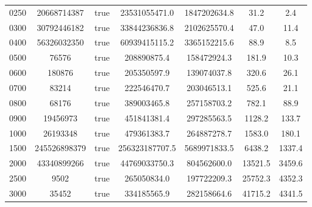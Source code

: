 \begin{center}
\begin{tabular}{|| c | c | c | c | c | c | c ||}
0250 & 20668714387 & true & 23531055471.0 & 1847202634.8 & 31.2 & 2.4 \\
0300 & 30792446182 & true & 33844236836.8 & 2102625570.4 & 47.0 & 11.4 \\
0400 & 56326032350 & true & 60939415115.2 & 3365152215.6 & 88.9 & 8.5 \\
0500 & 76576 & true & 208890875.4 & 158472924.3 & 181.9 & 10.3 \\
0600 & 180876 & true & 205350597.9 & 139074037.8 & 320.6 & 26.1 \\
0700 & 83214 & true & 222546470.7 & 203046513.1 & 525.6 & 21.1 \\
0800 & 68176 & true & 389003465.8 & 257158703.2 & 782.1 & 88.9 \\
0900 & 19456973 & true & 451841381.4 & 297285563.5 & 1128.2 & 133.7 \\
1000 & 26193348 & true & 479361383.7 & 264887278.7 & 1583.0 & 180.1 \\
1500 & 245526898379 & true & 256323187707.5 & 5689971833.5 & 6438.2 & 1337.4 \\
2000 & 43340899266 & true & 44769033750.3 & 804562600.0 & 13521.5 & 3459.6 \\
2500 & 9502 & true & 265050834.0 & 197722209.3 & 25752.3 & 4352.3 \\
3000 & 35452 & true & 334185565.9 & 282158664.6 & 41715.2 & 4341.5 \\
		\hline
	\end{tabular}
\end{center}
